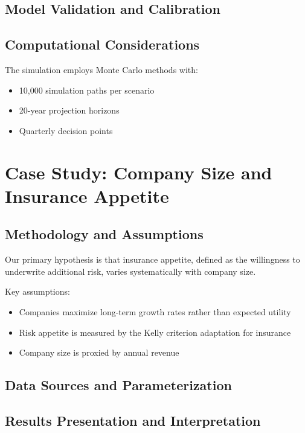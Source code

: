 \documentclass[11pt,letterpaper]{article}
\begin{document}
\subsection{Model Validation and Calibration}


\subsection{Computational Considerations}

The simulation employs Monte Carlo methods with:
\begin{itemize}
    \item 10,000 simulation paths per scenario
    \item 20-year projection horizons
    \item Quarterly decision points
\end{itemize}

\section{Case Study: Company Size and Insurance Appetite}

\subsection{Methodology and Assumptions}

Our primary hypothesis is that insurance appetite, defined as the willingness to underwrite additional risk, varies systematically with company size.

Key assumptions:
\begin{itemize}
    \item Companies maximize long-term growth rates rather than expected utility
    \item Risk appetite is measured by the Kelly criterion adaptation for insurance
    \item Company size is proxied by annual revenue
\end{itemize}

\subsection{Data Sources and Parameterization}


\subsection{Results Presentation and Interpretation}
\end{document}
